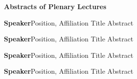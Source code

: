 \begin{center}
{\Large \bfseries Abstracts of Plenary Lectures}
\end{center}
\vspace{1ex}


\label{plenary1}
\abs
{{\bfseries Speaker}}{Position, Affiliation}
{Title}
{Abstract}
\bigskip


\label{plenary2}
\abs
{{\bfseries Speaker}}{Position, Affiliation}
{Title}
{Abstract}
\bigskip


\label{plenary3}
\abs
{{\bfseries Speaker}}{Position, Affiliation}
{Title}
{Abstract}
\bigskip


\label{plenary4}
\abs
{{\bfseries Speaker}}{Position, Affiliation}
{Title}
{Abstract}


